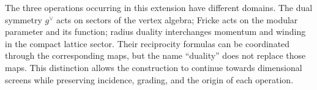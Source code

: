 The three operations occurring in this extension have
different domains. The dual symmetry \(g^\vee\) acts on sectors
of the vertex algebra; Fricke acts on the modular parameter and
its function; radius duality interchanges momentum and winding
in the compact lattice sector. Their reciprocity formulas can
be coordinated through the corresponding maps, but the name
“duality” does not replace those maps. This distinction allows the
construction to continue towards dimensional screens while preserving
incidence, grading, and the origin of each operation.

